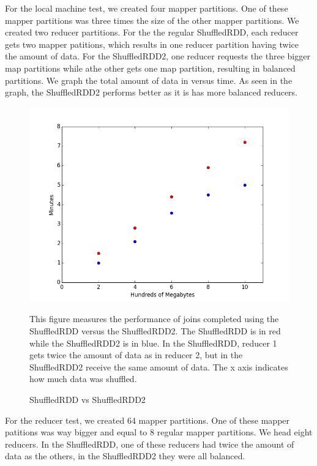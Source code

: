 For the local machine test, we created four mapper partitions. One of these mapper partitions was three times the size of the other mapper partitions.
We created two reducer partitions. For the the regular ShuffledRDD, each reducer gets two mapper patitions, which results in one reducer partition
having twice the amount of data. For the ShuffledRDD2, one reducer requests the three bigger map partitions while athe other gets one map partition, resulting in balanced partitions.
We graph the total amount of data in versus time. As seen in the graph, the ShuffledRDD2 performs better as it is  
has more balanced reducers.
\begin{figure}[h]
\begin{center}
\includegraphics[scale=0.6]{./img/localshuffle.png}
\caption{ShuffledRDD vs ShuffledRDD2}
\label{fig:local}
\end{center}
This figure measures the performance of joins completed using the ShuffledRDD versus the ShuffledRDD2.
The ShuffledRDD is in red while the ShuffledRDD2 is in blue. In the ShuffledRDD, reducer 1 gets twice the amount of
data as in reducer 2, but in the ShuffledRDD2 receive the same amount of data. The x axis indicates how much data was
shuffled.  
\end{figure}

For the reducer test, we created 64 mapper partitions. One of these mapper patitions was way bigger and equal to 8 regular mapper partitions.
We head eight reducers. In the ShuffledRDD, one of these reducers had twice the amount of data as the others, in the ShuffledRDD2 they were all
balanced.

